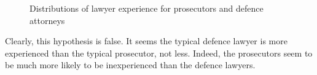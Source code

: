 \begin{figure}[h!]
  \caption[Lawyer Experience (Sunshine)]
  {Distributions of lawyer experience for prosecutors and defence attorneys}
  \label{fig:lawyerexp}
\end{figure}

Clearly, this hypothesis is false. It seems the typical defence lawyer is more experienced than the typical prosecutor, not
less. Indeed, the prosecutors seem to be much more likely to be inexperienced than the defence lawyers.